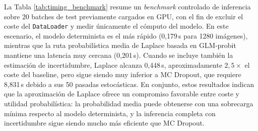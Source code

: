 \documentclass{article}
\begin{document}
La Tabla \ref{tab:timing_benchmark} resume un \emph{benchmark} controlado de inferencia sobre 20
batches de test previamente cargados en GPU, con el fin de excluir el
coste del \texttt{DataLoader} y medir \'{u}nicamente el c\'omputo del
modelo. En este escenario, el modelo determinista es el m\'as r\'apido
(0,179\,s para 1280 im\'agenes), mientras que la ruta probabil\'istica
media de Laplace basada en GLM-probit mantiene una latencia muy cercana
(0,201\,s). Cuando se incluye tambi\'en la estimaci\'on de incertidumbre,
Laplace alcanza 0,448\,s, aproximadamente \(2{,}5\times\) el coste del
baseline, pero sigue siendo muy inferior a MC Dropout, que requiere
8,831\,s debido a sus 50 pasadas estoc\'asticas. En conjunto, estos
resultados indican que la aproximaci\'on de Laplace ofrece un compromiso
favorable entre coste y utilidad probabil\'istica: la probabilidad media
puede obtenerse con una sobrecarga m\'inima respecto al modelo
determinista, y la inferencia completa con incertidumbre sigue siendo mucho
m\'as eficiente que MC Dropout.
\end{document}
